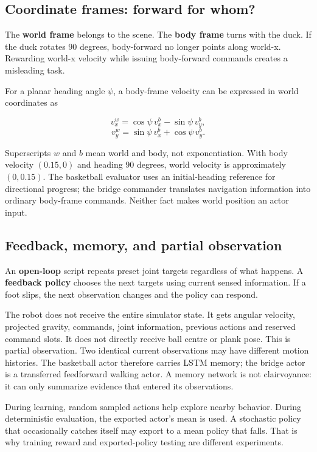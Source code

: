 \documentclass[
  american,
  11pt,
  letterpaper,
]{article}
\begin{document}
\subsection{Coordinate frames: forward for
whom?}\label{coordinate-frames-forward-for-whom}

The \textbf{world frame} belongs to the scene. The \textbf{body frame}
turns with the duck. If the duck rotates 90 degrees, body-forward no
longer points along world-x. Rewarding world-x velocity while issuing
body-forward commands creates a misleading task.

For a planar heading angle \(\psi\), a body-frame velocity can be
expressed in world coordinates as

\[v_x^w=\cos\psi\,v_x^b-\sin\psi\,v_y^b,\]
\[v_y^w=\sin\psi\,v_x^b+\cos\psi\,v_y^b.\]

Superscripts \(w\) and \(b\) mean world and body, not exponentiation.
With body velocity \((0.15,0)\) and heading 90 degrees, world velocity
is approximately \((0,0.15)\). The basketball evaluator uses an
initial-heading reference for directional progress; the bridge commander
translates navigation information into ordinary body-frame commands.
Neither fact makes world position an actor input.

\subsection{Feedback, memory, and partial
observation}\label{feedback-memory-and-partial-observation}

An \textbf{open-loop} script repeats preset joint targets regardless of
what happens. A \textbf{feedback policy} chooses the next targets using
current sensed information. If a foot slips, the next observation
changes and the policy can respond.

The robot does not receive the entire simulator state. It gets angular
velocity, projected gravity, commands, joint information, previous
actions and reserved command slots. It does not directly receive ball
centre or plank pose. This is partial observation. Two identical current
observations may have different motion histories. The basketball actor
therefore carries LSTM memory; the bridge actor is a transferred
feedforward walking actor. A memory network is not clairvoyance: it can
only summarize evidence that entered its observations.

During learning, random sampled actions help explore nearby behavior.
During deterministic evaluation, the exported actor's mean is used. A
stochastic policy that occasionally catches itself may export to a mean
policy that falls. That is why training reward and exported-policy
testing are different experiments.
\end{document}
